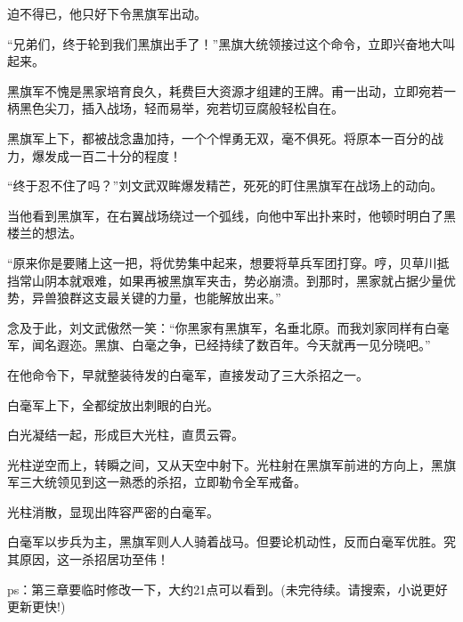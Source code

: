 \begin{this_body}
迫不得已，他只好下令黑旗军出动。

“兄弟们，终于轮到我们黑旗出手了！”黑旗大统领接过这个命令，立即兴奋地大叫起来。

黑旗军不愧是黑家培育良久，耗费巨大资源才组建的王牌。甫一出动，立即宛若一柄黑色尖刀，插入战场，轻而易举，宛若切豆腐般轻松自在。

黑旗军上下，都被战念蛊加持，一个个悍勇无双，毫不俱死。将原本一百分的战力，爆发成一百二十分的程度！

“终于忍不住了吗？”刘文武双眸爆发精芒，死死的盯住黑旗军在战场上的动向。

当他看到黑旗军，在右翼战场绕过一个弧线，向他中军出扑来时，他顿时明白了黑楼兰的想法。

“原来你是要赌上这一把，将优势集中起来，想要将草兵军团打穿。哼，贝草川抵挡常山阴本就艰难，如果再被黑旗军夹击，势必崩溃。到那时，黑家就占据少量优势，异兽狼群这支最关键的力量，也能解放出来。”

念及于此，刘文武傲然一笑：“你黑家有黑旗军，名垂北原。而我刘家同样有白毫军，闻名遐迩。黑旗、白毫之争，已经持续了数百年。今天就再一见分晓吧。”

在他命令下，早就整装待发的白毫军，直接发动了三大杀招之一。

白毫军上下，全都绽放出刺眼的白光。

白光凝结一起，形成巨大光柱，直贯云霄。

光柱逆空而上，转瞬之间，又从天空中射下。光柱射在黑旗军前进的方向上，黑旗军三大统领见到这一熟悉的杀招，立即勒令全军戒备。

光柱消散，显现出阵容严密的白毫军。

白毫军以步兵为主，黑旗军则人人骑着战马。但要论机动性，反而白毫军优胜。究其原因，这一杀招居功至伟！

ps：第三章要临时修改一下，大约21点可以看到。(未完待续。请搜索，小说更好更新更快!)

\end{this_body}

